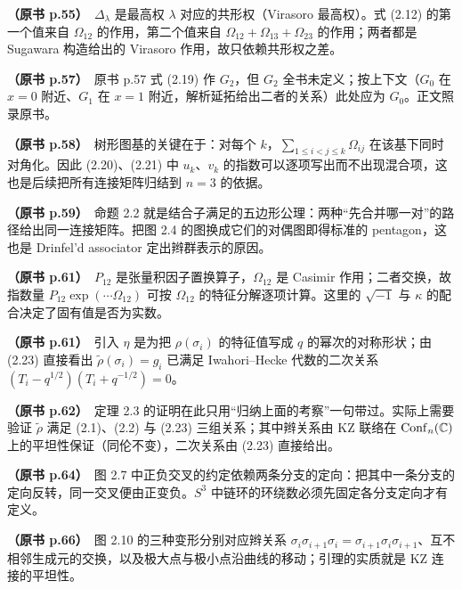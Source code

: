 \noindent \textbf{（原书 p.55）}\ $\Delta_\lambda$ 是最高权 $\lambda$ 对应的共形权（Virasoro 最高权）。式 (2.12) 的第一个值来自 $\Omega_{12}$ 的作用，第二个值来自 $\Omega_{12}+\Omega_{13}+\Omega_{23}$ 的作用；两者都是 Sugawara 构造给出的 Virasoro 作用，故只依赖共形权之差。\par\smallskip

\noindent \textbf{（原书 p.57）}\ 原书 p.57 式 (2.19) 作 $G_2$，但 $G_2$ 全书未定义；按上下文（$G_0$ 在 $x=0$ 附近、$G_1$ 在 $x=1$ 附近，解析延拓给出二者的关系）此处应为 $G_0$。正文照录原书。\par\smallskip

\noindent \textbf{（原书 p.58）}\ 树形图基的关键在于：对每个 $k$，$\sum_{1\le i<j\le k}\Omega_{ij}$ 在该基下同时对角化。因此 (2.20)、(2.21) 中 $u_k$、$v_k$ 的指数可以逐项写出而不出现混合项，这也是后续把所有连接矩阵归结到 $n=3$ 的依据。\par\smallskip

\noindent \textbf{（原书 p.59）}\ 命题 2.2 就是结合子满足的五边形公理：两种“先合并哪一对”的路径给出同一连接矩阵。把图 2.4 的图换成它们的对偶图即得标准的 pentagon，这也是 Drinfel'd associator 定出辫群表示的原因。\par\smallskip

\noindent \textbf{（原书 p.61）}\ $P_{12}$ 是张量积因子置换算子，$\Omega_{12}$ 是 Casimir 作用；二者交换，故指数量 $P_{12}\exp(\cdots\Omega_{12})$ 可按 $\Omega_{12}$ 的特征分解逐项计算。这里的 $\sqrt{-1}$ 与 $\kappa$ 的配合决定了固有值是否为实数。\par\smallskip

\noindent \textbf{（原书 p.61）}\ 引入 $\eta$ 是为把 $\rho(\sigma_i)$ 的特征值写成 $q$ 的幂次的对称形状；由 (2.23) 直接看出 $\tilde\rho(\sigma_i)=g_i$ 已满足 Iwahori--Hecke 代数的二次关系 $(T_i-q^{1/2})(T_i+q^{-1/2})=0$。\par\smallskip

\noindent \textbf{（原书 p.62）}\ 定理 2.3 的证明在此只用“归纳上面的考察”一句带过。实际上需要验证 $\tilde\rho$ 满足 (2.1)、(2.2) 与 (2.23) 三组关系；其中辫关系由 KZ 联络在 $\operatorname{Conf}_n(\mathbb{C})$ 上的平坦性保证（同伦不变），二次关系由 (2.23) 直接给出。\par\smallskip

\noindent \textbf{（原书 p.64）}\ 图 2.7 中正负交叉的约定依赖两条分支的定向：把其中一条分支的定向反转，同一交叉便由正变负。$S^3$ 中链环的环绕数必须先固定各分支定向才有定义。\par\smallskip

\noindent \textbf{（原书 p.66）}\ 图 2.10 的三种变形分别对应辫关系 $\sigma_i\sigma_{i+1}\sigma_i=\sigma_{i+1}\sigma_i\sigma_{i+1}$、互不相邻生成元的交换，以及极大点与极小点沿曲线的移动；引理的实质就是 KZ 连接的平坦性。\par\smallskip

